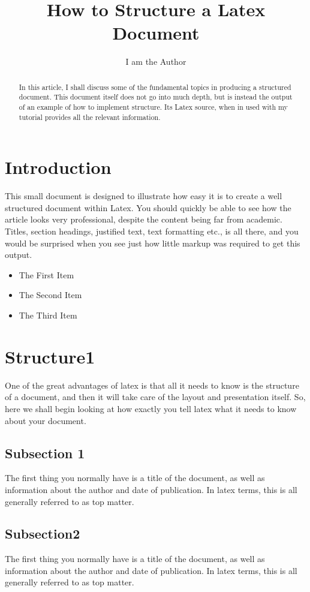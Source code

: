 
\title{How to Structure a Latex Document}

	\author{I am the Author }
	\begin{abstract}
		In this article, I shall discuss some of the fundamental topics in
		producing a structured document.  This document itself does not go into
		much depth, but is instead the output of an example of how to implement
		structure. Its Latex source, when in used with my tutorial
		provides all the relevant information.  
	\end{abstract}
			
	\section{Introduction}
	This small document is designed to illustrate how easy it is to create a
	well structured document within Latex.  You should quickly be able to
	see how the article looks very professional, despite the content being
	far from academic.  Titles, section headings, justified text, text
	formatting etc., is all there, and you would be surprised when you see
	just how little markup was required to get this output.

	\begin{itemize}
		\item The First Item
		\item The Second Item
		\item The Third Item
	\end{itemize}
	\section{Structure1}
	One of the great advantages of latex is that all it needs to know is
	the structure of a document, and then it will take care of the layout
	and presentation itself.  So, here we shall begin looking at how exactly
	you tell latex what it needs to know about your document.
	
	\subsection{Subsection 1}
	The first thing you normally have is a title of the document, as well as
	information about the author and date of publication. In latex terms,
	this is all generally referred to as top matter.

	\subsection{Subsection2}
	The first thing you normally have is a title of the document, as well as
	information about the author and date of publication. In latex terms,
	this is all generally referred to as top matter.

